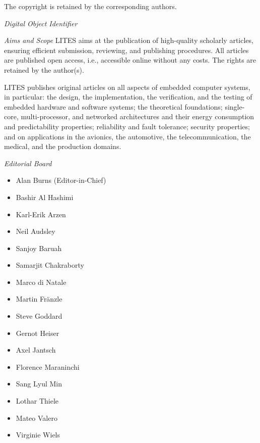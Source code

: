 \documentclass[a4paper,UKenglish]{litesmaster}
\begin{document}
\begin{publicationinfo}
The copyright is retained by the corresponding authors.

\vfill
\emph{Digital Object Identifier}\newline
\printIssueDOI

\newpage


\bigskip

\emph{Aims and Scope}\newline
LITES aims at the publication of high-quality scholarly articles, ensuring efficient submission, reviewing, and publishing procedures. All articles are published open access, i.e., accessible online without any costs. The rights are retained by the author(s).

\medskip

LITES publishes original articles on all aspects of embedded computer systems, in particular: the design, the implementation, the verification, and the testing of embedded hardware and software systems; the theoretical foundations; single-core, multi-processor, and networked architectures and their energy consumption and predictability properties; reliability and fault tolerance; security properties; and on applications in the avionics, the automotive, the telecommunication, the medical, and the production domains. 

\bigskip

\emph{Editorial Board}
\begin{itemize}
\item Alan Burns (Editor-in-Chief)%
\item Bashir Al Hashimi %
\item Karl-Erik Arzen %
\item Neil Audsley %
\item Sanjoy Baruah %
\item Samarjit Chakraborty %
\item Marco di Natale %
\item Martin Fr\"anzle %
\item Steve Goddard %
\item Gernot Heiser%
\item Axel Jantsch %
\item Florence Maraninchi %
\item Sang Lyul Min %
\item Lothar Thiele %
\item Mateo Valero %
\item Virginie Wiels %
\end{itemize}


\end{publicationinfo}
\end{document}
